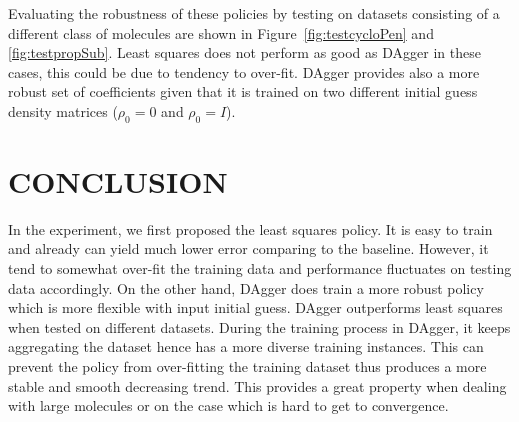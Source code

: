 \documentclass[twoside,11pt]{article}
\begin{document}
Evaluating the robustness of these policies by testing on datasets consisting of a different class of molecules are shown in Figure~\ref{fig:testcycloPen} and \ref{fig:testpropSub}. Least squares does not perform as good as DAgger in these cases, this could be due to tendency to over-fit. DAgger provides also a more robust set of coefficients given that it is trained on two different initial guess density matrices ($\rho_0 = 0$ and $\rho_0 = I$).



\section{CONCLUSION}
In the experiment, we first proposed the least squares policy. It is easy to train and already can yield much lower error comparing to the baseline. However, it tend to somewhat over-fit the training data and performance fluctuates on testing data accordingly. On the other hand, DAgger does train a more robust policy which is more flexible with input initial guess. DAgger outperforms least squares when tested on different datasets.  
During the training process in DAgger, it keeps aggregating the dataset hence has a more diverse training instances. This can prevent the policy from over-fitting the training dataset thus produces a more stable and smooth decreasing trend. This provides a great property when dealing with large molecules or on the case which is hard to get to convergence.


\end{document}
